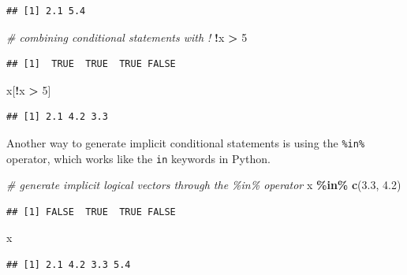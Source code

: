 \documentclass[
]{book}
\newenvironment{Shaded}{\begin{snugshade}}{\end{snugshade}}
\newcommand{\CommentTok}[1]{\textcolor[rgb]{0.56,0.35,0.01}{\textit{#1}}}
\newcommand{\DecValTok}[1]{\textcolor[rgb]{0.00,0.00,0.81}{#1}}
\newcommand{\FloatTok}[1]{\textcolor[rgb]{0.00,0.00,0.81}{#1}}
\newcommand{\FunctionTok}[1]{\textcolor[rgb]{0.13,0.29,0.53}{\textbf{#1}}}
\newcommand{\NormalTok}[1]{#1}
\newcommand{\SpecialCharTok}[1]{\textcolor[rgb]{0.81,0.36,0.00}{\textbf{#1}}}
\begin{document}
\begin{verbatim}
## [1] 2.1 5.4
\end{verbatim}

\begin{Shaded}
\begin{Highlighting}[]
\CommentTok{\# combining conditional statements with !}
\SpecialCharTok{!}\NormalTok{x }\SpecialCharTok{\textgreater{}} \DecValTok{5}
\end{Highlighting}
\end{Shaded}

\begin{verbatim}
## [1]  TRUE  TRUE  TRUE FALSE
\end{verbatim}

\begin{Shaded}
\begin{Highlighting}[]
\NormalTok{x[}\SpecialCharTok{!}\NormalTok{x }\SpecialCharTok{\textgreater{}} \DecValTok{5}\NormalTok{]}
\end{Highlighting}
\end{Shaded}

\begin{verbatim}
## [1] 2.1 4.2 3.3
\end{verbatim}

Another way to generate implicit conditional statements is using the \texttt{\%in\%} operator, which works like the \texttt{in} keywords in Python.

\begin{Shaded}
\begin{Highlighting}[]
\CommentTok{\# generate implicit logical vectors through the \%in\% operator}
\NormalTok{x }\SpecialCharTok{\%in\%} \FunctionTok{c}\NormalTok{(}\FloatTok{3.3}\NormalTok{, }\FloatTok{4.2}\NormalTok{)}
\end{Highlighting}
\end{Shaded}

\begin{verbatim}
## [1] FALSE  TRUE  TRUE FALSE
\end{verbatim}

\begin{Shaded}
\begin{Highlighting}[]
\NormalTok{x}
\end{Highlighting}
\end{Shaded}

\begin{verbatim}
## [1] 2.1 4.2 3.3 5.4
\end{verbatim}
\end{document}
